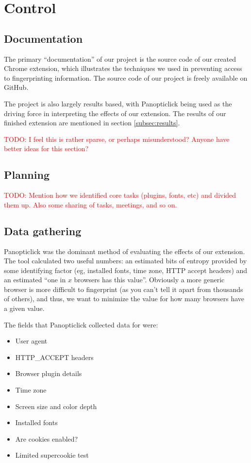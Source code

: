 \documentclass[12pt,a4paper]{article}
\begin{document}
\section{Control}
\subsection{Documentation}
The primary ``documentation'' of our project is the source code of our created Chrome extension, which illustrates the techniques we used in preventing access to fingerprinting information. The source code of our project is freely available on GitHub\cite{github}.

The project is also largely results based, with Panopticlick being used as the driving force in interpreting the effects of our extension. The results of our finished extension are mentioned in section \ref{subsec:results}.

\textcolor{red}{TODO: I feel this is rather sparse, or perhaps misunderstood? Anyone have better ideas for this section?}

\subsection{Planning}
\textcolor{red}{TODO: Mention how we identified core tasks (plugins, fonts, etc) and divided them up. Also some sharing of tasks, meetings, and so on.}

\subsection{Data gathering}
Panopticlick was the dominant method of evaluating the effects of our extension. The tool calculated two useful numbers: an estimated bits of entropy provided by some identifying factor (eg, installed fonts, time zone, HTTP accept headers) and an estimated ``one in $x$ browsers has this value''. Obviously a more generic browser is more difficult to fingerprint (as you can't tell it apart from thousands of others), and thus, we want to minimize the value for how many browsers have a given value.

The fields that Panopticlick collected data for were:

\begin{itemize}
	\item User agent
	\item HTTP\_ACCEPT headers
	\item Browser plugin details
	\item Time zone
	\item Screen size and color depth
	\item Installed fonts
	\item Are cookies enabled?
	\item Limited supercookie test
\end{itemize}
\end{document}
